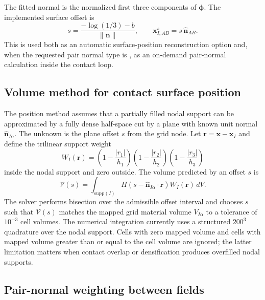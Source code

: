 The fitted normal is the normalized first three components of $\boldsymbol{\phi}$.  The implemented surface offset is
\begin{equation}
  s=\frac{-\log(1/3)-b}{\|\mathbf{n}\|},
  \qquad
  \mathbf{x}^{s}_{I,AB}=s\,\hat{\mathbf{n}}_{AB}.
  \label{eq:contact-lr-offset}
\end{equation}
This is used both as an automatic surface-position reconstruction option and, when the requested pair normal type is , as an on-demand pair-normal calculation inside the contact loop.

\subsection{Volume method for contact surface position}
\label{subsec:volume-method-contact-position}

The  position method assumes that a partially filled nodal support can be approximated by a fully dense half-space cut by a plane with known unit normal $\hat{\mathbf{n}}_{I\alpha}$.  The unknown is the plane offset $s$ from the grid node.  Let $\mathbf{r}=\mathbf{x}-\mathbf{x}_I$ and define the trilinear support weight
\begin{equation}
  W_I(\mathbf{r})=
  \left(1-\frac{|r_1|}{h_1}\right)
  \left(1-\frac{|r_2|}{h_2}\right)
  \left(1-\frac{|r_3|}{h_3}\right)
\end{equation}
inside the nodal support and zero outside.  The volume predicted by an offset $s$ is
\begin{equation}
  \mathcal{V}(s)=
  \int_{\mathrm{supp}(I)}
  H\!\left(s-\hat{\mathbf{n}}_{I\alpha}\cdot\mathbf{r}\right)
  W_I(\mathbf{r})\,dV.
  \label{eq:contact-volume-offset}
\end{equation}
The solver performs bisection over the admissible offset interval and chooses $s$ such that $\mathcal{V}(s)$ matches the mapped grid material volume $V_{I\alpha}$ to a tolerance of $10^{-3}$ cell volumes.  The numerical integration currently uses a structured $200^3$ quadrature over the nodal support.  Cells with zero mapped volume and cells with mapped volume greater than or equal to the cell volume are ignored; the latter limitation matters when contact overlap or densification produces overfilled nodal supports.

\subsection{Pair-normal weighting between fields}
\label{subsec:contact-normal-weighting}

